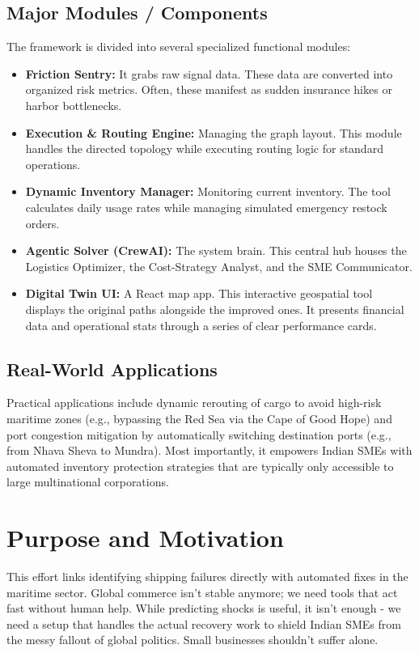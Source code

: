 \subsection{Major Modules / Components}
The framework is divided into several specialized functional modules:
\begin{itemize}
    \item \textbf{Friction Sentry:} It grabs raw signal data. These data are converted into organized risk metrics. Often, these manifest as sudden insurance hikes or harbor bottlenecks.
    \item \textbf{Execution \& Routing Engine:} Managing the graph layout. This module handles the directed topology while executing routing logic for standard operations.
    \item \textbf{Dynamic Inventory Manager:} Monitoring current inventory. The tool calculates daily usage rates while managing simulated emergency restock orders.
    \item \textbf{Agentic Solver (CrewAI):} The system brain. This central hub houses the Logistics Optimizer, the Cost-Strategy Analyst, and the SME Communicator.
    \item \textbf{Digital Twin UI:} A React map app. This interactive geospatial tool displays the original paths alongside the improved ones. It presents financial data and operational stats through a series of clear performance cards.
\end{itemize}

\subsection{Real-World Applications}
Practical applications include dynamic rerouting of cargo to avoid high-risk maritime zones (e.g., bypassing the Red Sea via the Cape of Good Hope) and port congestion mitigation by automatically switching destination ports (e.g., from Nhava Sheva to Mundra). Most importantly, it empowers Indian SMEs with automated inventory protection strategies that are typically only accessible to large multinational corporations.

\section[Purpose and Motivation]{\textbf{Purpose and Motivation}}

This effort links identifying shipping failures directly with automated fixes in the maritime sector. Global commerce isn't stable anymore; we need tools that act fast without human help. While predicting shocks is useful, it isn't enough - we need a setup that handles the actual recovery work to shield Indian SMEs from the messy fallout of global politics. Small businesses shouldn't suffer alone.

